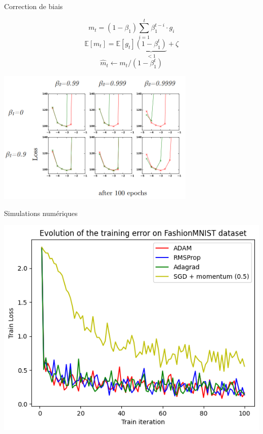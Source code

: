 \documentclass[11pt,aspectratio=169,xcolor=dvipsnames, french]{beamer}
\begin{document}
\begin{frame}{Correction de biais}
	\begin{minipage}[c]{.3\linewidth}
	$$m_t=(1-\beta_1)\displaystyle\sum_{i=1}^t\beta_1^{t-i}\cdotp g_i$$
$$\mathbb E[m_t]
= \mathbb E[g_t]\underset{<1}{\underbrace{(1-\beta_1^t)}}+\zeta$$
$$\widehat m_t \longleftarrow m_t/(1-\beta_1^t)$$
	\end{minipage} \hfill
	\begin{minipage}[c]{.65\linewidth}
\includegraphics[width=9.5cm]{../Images/bias_epochs100.png}

	\end{minipage}
\end{frame}








\begin{frame}{Simulations numériques}
\begin{center}
  \includegraphics[width=0.45\linewidth]{../Images/FashionMNIST.png} 
\end{center}
\end{frame}
\end{document}
